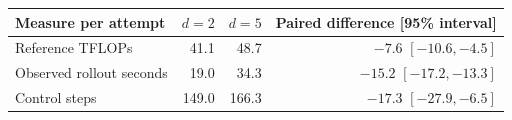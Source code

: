 \begin{tabular}{@{}lrrr@{}}
\toprule
Measure per attempt & $d=2$ & $d=5$ & Paired difference [95\% interval]\\
\midrule
Reference TFLOPs & 41.1 & 48.7 & $-7.6$ $[-10.6,-4.5]$\\
Observed rollout seconds & 19.0 & 34.3 & $-15.2$ $[-17.2,-13.3]$\\
Control steps & 149.0 & 166.3 & $-17.3$ $[-27.9,-6.5]$\\
\bottomrule
\end{tabular}
